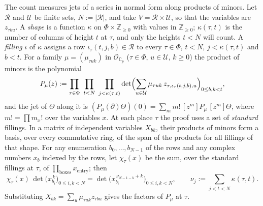 \documentclass[reqno]{amsart}
\theoremstyle{definition}
\theoremstyle{plain}
\newcommand{\Z}{\mathbb{Z}}
\newcommand{\C}{\mathbb{C}}
\newcommand{\Op}{\mathcal{O}_{\C_p}}
\begin{document}
The count measures jets of a series in normal form along products of minors.  Let \(\mathcal{R}\) and \(\mathcal{U}\) be finite sets, \(N := |\mathcal{R}|\), and take \(V = \mathcal{R} \times \mathcal{U}\), so that the variables are \(z_{\tau b u}\).  A \emph{shape} is a function \(\kappa\) on \(\Phi \times \Z_{\ge 0}\) with values in \(\Z_{\ge 0}\); \(\kappa(\tau, t)\) is the number of columns of height \(t\) at \(\tau\), and only the heights \(t < N\) will count.  A \emph{filling} \(\iota\) of \(\kappa\) assigns a row \(\iota_\tau(t, j, b) \in \mathcal{R}\) to every \(\tau \in \Phi\), \(t < N\), \(j < \kappa(\tau, t)\) and \(b < t\).  For a family \(\mu = (\mu_{\tau u k})\) in \(\Op\) (\(\tau \in \Phi\), \(u \in \mathcal{U}\), \(k \ge 0\)) the product of minors is the polynomial
\[
  P_\mu(z) := \prod_{\tau \in \Phi}\ \prod_{t < N}\ \prod_{j < \kappa(\tau, t)} \det\Bigl( \sum_{u \in \mathcal{U}} \mu_{\tau u k}\, z_{\tau, \iota_\tau(t,j,b), u} \Bigr)_{0 \le b, k < t},
\]
and the jet of \(\Theta\) along it is \((P_\mu(\partial)\Theta)(0) = \sum_m m!\, [z^m]P_\mu\, [z^m]\Theta\), where \(m! = \prod m_x!\) over the variables \(x\).  At each place \(\tau\) the proof uses a set of \emph{standard} fillings.  In a matrix of independent variables \(X_{bk}\), their products of minors form a basis, over every commutative ring, of the span of the products for all fillings of that shape.  For any enumeration \(b_0, \ldots, b_{N-1}\) of the rows and any complex numbers \(x_b\) indexed by the rows, let \(\chi_\tau(x)\) be the sum, over the standard fillings at \(\tau\), of \(\prod_{\text{boxes}} x_{\text{entry}}\); then
\[
  \chi_\tau(x)\,\det\bigl(x_{b_i}^{\,k}\bigr)_{0 \le i,k < N}
  = \det\bigl(x_{b_i}^{\,\nu_{N-1-k}+k}\bigr)_{0 \le i,k < N},
  \qquad
  \nu_j := \sum_{j < t < N} \kappa(\tau,t).
\]  Substituting \(X_{bk} = \sum_u \mu_{\tau u k} z_{\tau b u}\) gives the factors of \(P_\mu\) at \(\tau\).
\end{document}
